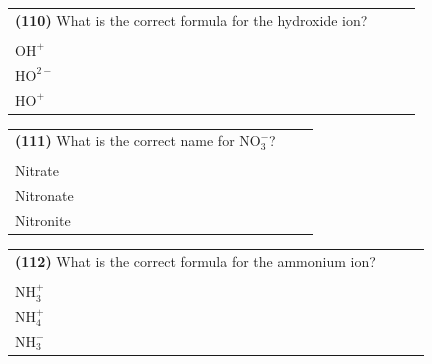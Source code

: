 \documentclass{article}
\begin{document}
\vspace{0.2cm}
\noindent
\begin{tabular}{|p{0.9\linewidth}|}
\hline
\vspace{0.2cm}
\textbf{(110)} What is the correct formula for the hydroxide ion? \\
\begin{minipage}[t]{0.85\linewidth}
\begin{enumerate}[label=\alph*.]
\item $\text{OH}^{-}$ \\
\item $\text{OH}^{+}$ \\
\item $\text{HO}^{2-}$ \\
\item $\text{HO}^{+}$
\end{enumerate}
\end{minipage}\\
\hline
\end{tabular}

\vspace{0.2cm}
\noindent
\begin{tabular}{|p{0.9\linewidth}|}
\hline
\vspace{0.2cm}
\textbf{(111)} What is the correct name for $\text{NO}_3^{-}$? \\
\begin{minipage}[t]{0.85\linewidth}
\begin{enumerate}[label=\alph*.]
\item Nitrite \\
\item Nitrate \\
\item Nitronate \\
\item Nitronite
\end{enumerate}
\end{minipage}\\
\hline
\end{tabular}

\vspace{0.2cm}
\noindent
\begin{tabular}{|p{0.9\linewidth}|}
\hline
\vspace{0.2cm}
\textbf{(112)} What is the correct formula for the ammonium ion? \\
\begin{minipage}[t]{0.85\linewidth}
\begin{enumerate}[label=\alph*.]
\item $\text{NH}_4^{-}$ \\
\item $\text{NH}_3^{+}$ \\
\item $\text{NH}_4^{+}$ \\
\item $\text{NH}_3^{-}$
\end{enumerate}
\end{minipage}\\
\hline
\end{tabular}
\end{document}
